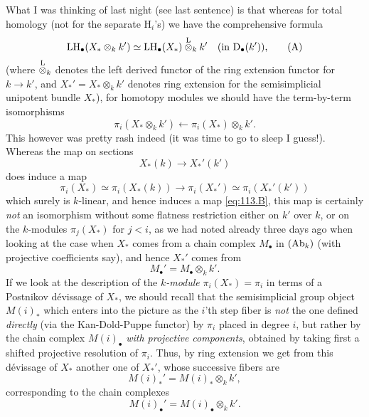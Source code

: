 \label{sec:113}%
What I was thinking of last night (see last sentence) is that whereas
for total homology (not for the separate $\mathrm H_i$'s) we have the
comprehensive formula
\begin{equation}
  \label{eq:113.A}
  \operatorname{LH}_\bullet(X_* \otimes_k k') \simeq \operatorname{LH}_\bullet(X_*) \mathbin{\overset{\mathrm{L}}{\otimes}}_k k'
  \quad\text{(in ${\mathrm{D}}_\bullet(k')$),}\tag{A}
\end{equation}
(where $\mathbin{\overset{\mathrm{L}}{\otimes}}_k$ denotes the left derived functor of the ring
extension functor for $k\to k'$, and $X_*'=X_*\otimes_k k'$ denotes
ring extension for the semisimplicial unipotent bundle $X_*$), for
homotopy modules we should have the term-by-term isomorphisms
\begin{equation}
  \label{eq:113.B}
  \pi_i(X_*\otimes_k k')\leftarrow \pi_i(X_*) \otimes_k k'.\tag{B}
\end{equation}
This however was pretty rash indeed (it was time to go to sleep I
guess!). Whereas the map on sections
\[X_*(k)\to X_*'(k')\]
does induce a map
\begin{equation}
  \label{eq:113.Bprime}
  \pi_i(X_*) \simeq \pi_i(X_*(k)) \to \pi_i(X_*')\simeq\pi_i(X_*'(k'))
  \tag{B'} 
\end{equation}
which surely is $k$-linear, and hence induces a map \eqref{eq:113.B},
this map is certainly \emph{not} an isomorphism without some flatness
restriction either on $k'$ over $k$, or on the $k$-modules
$\pi_j(X_*)$ for $j<i$, as we had noted already three days ago when
looking at the case when $X_*$ comes from a chain complex $M_\bullet$
in $(\operatorname{Ab}_k)$ (with projective coefficients say), and hence $X_*'$
comes from
\[M_\bullet' = M_\bullet \otimes_k k'.\]
If we look at the description of the \emph{$k$-module}
$\pi_i(X_*)=\pi_i$ in terms of a Postnikov dévissage of $X_*$, we
should recall that the semisimplicial group object $M(i)_*$ which
enters into the picture as the $i$'th step fiber is \emph{not} the one
defined \emph{directly} (via the Kan-Dold-Puppe functor) by $\pi_i$
placed in degree $i$, but rather by the chain complex $M(i)_\bullet$
\emph{with projective components}, obtained by taking first a shifted
projective resolution of $\pi_i$. Thus, by ring extension we get from
this dévissage of $X_*$ another one of $X_*'$, whose successive fibers
are
\[M(i)_*' = M(i)_* \otimes_k k',\]
corresponding to the chain complexes
\[M(i)_\bullet' = M(i)_\bullet \otimes_k k'.\]
